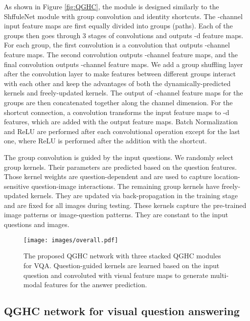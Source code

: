 \documentclass[runningheads]{llncs}
\begin{document}
As shown in Figure \ref{fig:QGHC}, the module is designed similarly to the ShffuleNet \cite{zhang2017shufflenet} module with group convolution and identity shortcuts. The -channel input feature maps are first equally divided into  groups (paths). Each of the  groups then goes through 3 stages of convolutions and outputs -d feature maps. For each group, the first convolution is a  convolution that outputs -channel feature maps. The second  convolution outputs -channel feature maps, and the final  convolution outputs -channel feature maps. We add a group shuffling layer after the  convolution layer to make features between different groups interact with each other and keep the advantages of both the dynamically-predicted kernels and freely-updated kernels. The output of -channel feature maps for the  groups are then concatenated together along the channel dimension. For the shortcut connection, a  convolution transforms the input feature maps to -d features, which are added with the output feature maps. Batch Normalization and ReLU are performed after each convolutional operation except for the last one, where ReLU is performed after the addition with the shortcut.


The  group convolution is guided by the input questions. We randomly select  group kernels. Their parameters are predicted based on the question features.
Those kernel weights are question-dependent and are used to capture location-sensitive question-image interactions. 
The remaining  group kernels have freely-updated kernels. They are updated via back-propagation in the training stage and are fixed for all images during testing. These kernels capture the pre-trained image patterns or image-question patterns. They are constant to the input questions and images.

\begin{figure*}[t!]
        \begin{center}
                \texttt{[image: images/overall.pdf]}
        \end{center}
        \caption{The proposed QGHC network with three stacked QGHC modules for VQA. Question-guided kernels are learned based on the input question and convoluted with visual feature maps to generate multi-modal features for the answer prediction.}
        \label{fig:overall}
\end{figure*}

\subsection{QGHC network for visual question answering}
\label{sec:lghc_network}
\end{document}
